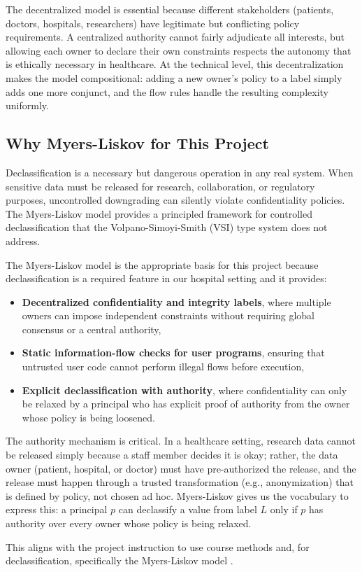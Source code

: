 The decentralized model is essential because different stakeholders (patients, doctors, hospitals, researchers) have legitimate but conflicting policy requirements. A centralized authority cannot fairly adjudicate all interests, but allowing each owner to declare their own constraints respects the autonomy that is ethically necessary in healthcare. At the technical level, this decentralization makes the model compositional: adding a new owner's policy to a label simply adds one more conjunct, and the flow rules handle the resulting complexity uniformly.

\subsection{Why Myers-Liskov for This Project}

Declassification is a necessary but dangerous operation in any real system. When sensitive data must be released for research, collaboration, or regulatory purposes, uncontrolled downgrading can silently violate confidentiality policies. The Myers-Liskov model provides a principled framework for controlled declassification that the Volpano-Simoyi-Smith (VSI) type system does not address.

The Myers-Liskov model is the appropriate basis for this project because declassification is a required feature in our hospital setting and it provides:
\begin{itemize}
    \item \textbf{Decentralized confidentiality and integrity labels}, where multiple owners can impose independent constraints without requiring global consensus or a central authority,
    \item \textbf{Static information-flow checks for user programs}, ensuring that untrusted user code cannot perform illegal flows before execution,
    \item \textbf{Explicit declassification with authority}, where confidentiality can only be relaxed by a principal who has explicit proof of authority from the owner whose policy is being loosened.
\end{itemize}

The authority mechanism is critical. In a healthcare setting, research data cannot be released simply because a staff member decides it is okay; rather, the data owner (patient, hospital, or doctor) must have pre-authorized the release, and the release must happen through a trusted transformation (e.g., anonymization) that is defined by policy, not chosen ad hoc. Myers-Liskov gives us the vocabulary to express this: a principal $p$ can declassify a value from label $L$ only if $p$ has authority over every owner whose policy is being relaxed.

This aligns with the project instruction to use course methods and, for declassification, specifically the Myers-Liskov model \cite{ProjectDescription}.

